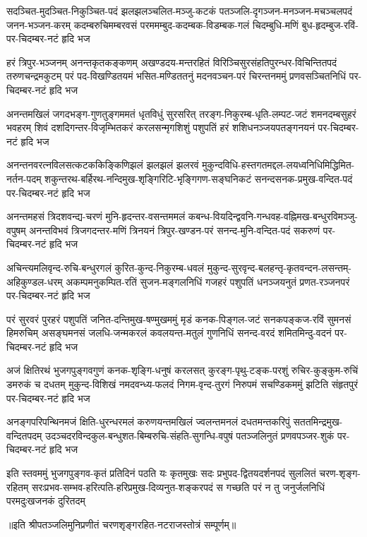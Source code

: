 \setlength{\shlokaspaceskip}{4pt}
\fourlineindentedshloka
{सदञ्चित-मुदञ्चित-निकुञ्चित-पदं झलझलञ्चलित-मञ्जु-कटकं}
{पतञ्जलि-दृगञ्जन-मनञ्जन-मचञ्चलपदं जनन-भञ्जन-करम्}
{कदम्बरुचिमम्बरवसं परममम्बुद-कदम्बक-विडम्बक-गलं}
{चिदम्बुधि-मणिं बुध-हृदम्बुज-रविं-पर-चिदम्बर-नटं हृदि भज} %

\fourlineindentedshloka
{हरं त्रिपुर-भञ्जनम् अनन्तकृतकङ्कणम् अखण्डदय-मन्तरहितं}
{विरिञ्चिसुरसंहतिपुरन्धर-विचिन्तितपदं तरुणचन्द्रमकुटम्}
{परं पद-विखण्डितयमं भसित-मण्डिततनुं मदनवञ्चन-परं}
{चिरन्तनममुं प्रणवसञ्चितनिधिं पर-चिदम्बर-नटं हृदि भज} %

\fourlineindentedshloka
{अनन्तमखिलं जगदभङ्ग-गुणतुङ्गममतं धृतविधुं सुरसरित्}
{तरङ्ग-निकुरम्ब-धृति-लम्पट-जटं शमनदम्बसुहरं भवहरम्}
{शिवं दशदिगन्तर-विजृम्भितकरं करलसन्मृगशिशुं पशुपतिं}
{हरं शशिधनञ्जयपतङ्गनयनं पर-चिदम्बर-नटं हृदि भज} %

\fourlineindentedshloka
{अनन्तनवरत्नविलसत्कटककिङ्किणिझलं झलझलं झलरवं}
{मुकुन्दविधि-हस्तगतमद्दल-लयध्वनिधिमिद्धिमित-नर्तन-पदम्}
{शकुन्तरथ-बर्हिरथ-नन्दिमुख-शृङ्गिरिटि-भृङ्गिगण-सङ्घनिकटं}
{सनन्दसनक-प्रमुख-वन्दित-पदं पर-चिदम्बर-नटं हृदि भज} %

\fourlineindentedshloka
{अनन्तमहसं त्रिदशवन्द्य-चरणं मुनि-हृदन्तर-वसन्तममलं}
{कबन्ध-वियदिन्द्ववनि-गन्धवह-वह्निमख-बन्धुरविमञ्जु-वपुषम्}
{अनन्तविभवं त्रिजगदन्तर-मणिं त्रिनयनं त्रिपुर-खण्डन-परं}
{सनन्द-मुनि-वन्दित-पदं सकरुणं पर-चिदम्बर-नटं हृदि भज} %

\fourlineindentedshloka
{अचिन्त्यमलिवृन्द-रुचि-बन्धुरगलं कुरित-कुन्द-निकुरम्ब-धवलं}
{मुकुन्द-सुरवृन्द-बलहन्तृ-कृतवन्दन-लसन्तम्-अहिकुण्डल-धरम्}
{अकम्पमनुकम्पित-रतिं सुजन-मङ्गलनिधिं गजहरं पशुपतिं}
{धनञ्जयनुतं प्रणत-रञ्जनपरं पर-चिदम्बर-नटं हृदि भज} %

\fourlineindentedshloka
{परं सुरवरं पुरहरं पशुपतिं जनित-दन्तिमुख-षण्मुखममुं}
{मृडं कनक-पिङ्गल-जटं सनकपङ्कज-रविं सुमनसं हिमरुचिम्}
{असङ्घमनसं जलधि-जन्मकरलं कवलयन्त-मतुलं गुणनिधिं}
{सनन्द-वरदं शमितमिन्दु-वदनं पर-चिदम्बर-नटं हृदि भज} %

\fourlineindentedshloka
{अजं क्षितिरथं भुजगपुङ्गवगुणं कनक-शृङ्गि-धनुषं करलसत्}
{कुरङ्ग-पृथु-टङ्क-परशुं रुचिर-कुङ्कुम-रुचिं डमरुकं च दधतम्}
{मुकुन्द-विशिखं नमदवन्ध्य-फलदं निगम-वृन्द-तुरगं निरुपमं}
{सचण्डिकममुं झटिति संहृतपुरं पर-चिदम्बर-नटं हृदि भज} %

\fourlineindentedshloka
{अनङ्गपरिपन्थिनमजं क्षिति-धुरन्धरमलं करुणयन्तमखिलं}
{ज्वलन्तमनलं दधतमन्तकरिपुं सततमिन्द्रमुख-वन्दितपदम्}
{उदञ्चदरविन्दकुल-बन्धुशत-बिम्बरुचि-संहति-सुगन्धि-वपुषं}
{पतञ्जलिनुतं प्रणवपञ्जर-शुकं पर-चिदम्बर-नटं हृदि भज} %

\fourlineindentedshloka
{इति स्तवममुं भुजगपुङ्गव-कृतं प्रतिदिनं पठति यः कृतमुखः}
{सदः प्रभुपद-द्वितयदर्शनपदं सुललितं चरण-शृङ्ग-रहितम्}
{सरःप्रभव-सम्भव-हरित्पति-हरिप्रमुख-दिव्यनुत-शङ्करपदं}
{स गच्छति परं न तु जनुर्जलनिधिं परमदुःखजनकं दुरितदम्} %

॥इति श्रीपतञ्जलिमुनिप्रणीतं चरणशृङ्गरहित-नटराजस्तोत्रं सम्पूर्णम्॥
\setlength{\shlokaspaceskip}{24pt}